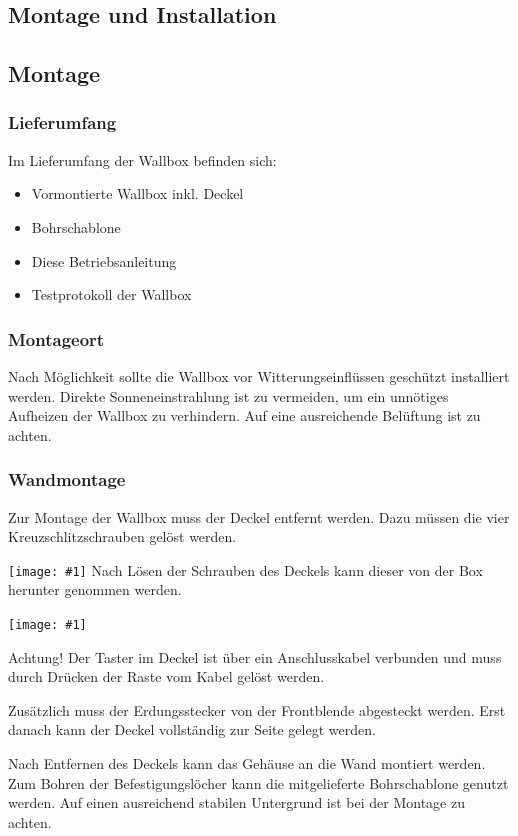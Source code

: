 \documentclass[a4paper,10pt]{article}
\newcommand{\hint}[1]{\begin{tcolorbox}[colback=boxgray,colframe=black,coltext=
white,title=Hinweis]#1\end{tcolorbox}}
\newcommand{\gfx}[1]{\texttt{[image: \#1]}}
\begin{document}
\begin{multicols*}{2}
	\section{Montage und Installation}
	\subsection{Montage}
	\subsubsection{Lieferumfang}
	Im Lieferumfang der Wallbox befinden sich:
	\begin{itemize}
		\item Vormontierte Wallbox inkl. Deckel
		\item Bohrschablone
		\item Diese Betriebsanleitung
		\item Testprotokoll der Wallbox
	\end{itemize}

	\subsubsection{Montageort}
	Nach Möglichkeit sollte die Wallbox vor Witterungseinflüssen geschützt
	installiert werden. Direkte Sonneneinstrahlung ist zu vermeiden, um ein
	unnötiges Aufheizen der Wallbox zu verhindern. Auf eine ausreichende Belüftung
	ist zu achten.

	\subsubsection{Wandmontage}\label{wandmontage}
	Zur Montage der Wallbox muss der Deckel entfernt werden. Dazu müssen die
	vier Kreuzschlitzschrauben gelöst werden.

	\gfx{./img/resized/warp_screw_points_ready}
	Nach Lösen der Schrauben des Deckels kann dieser von der Box herunter genommen
	werden.

	\gfx{./img/resized/warp_button_connect_arrow_ready}

	\hint{Achtung! Der Taster im Deckel ist über ein Anschlusskabel verbunden und muss
		durch Drücken der Raste vom Kabel gelöst werden.}
	Zusätzlich muss der Erdungsstecker von der Frontblende abgesteckt werden.
	Erst danach kann der Deckel vollständig zur Seite gelegt werden.

	Nach Entfernen des Deckels kann das Gehäuse an die Wand montiert werden. Zum
	Bohren der Befestigungslöcher kann die mitgelieferte Bohrschablone genutzt
	werden. Auf einen ausreichend stabilen Untergrund ist bei der Montage zu
	achten.


\end{multicols*}
\end{document}
